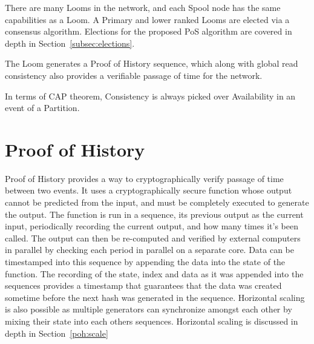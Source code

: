 \documentclass[12pt]{article}
\begin{document}
There are many Looms in the network, and each Spool node has the same capabilities as a Loom.  A Primary and lower ranked Looms are elected via a consensus algorithm. Elections for the proposed PoS algorithm are covered in depth in Section~\ref{subsec:elections}.

The Loom generates a Proof of History sequence, which along with global read consistency also provides a verifiable passage of time for the network.

In terms of CAP theorem, Consistency is always picked over Availability in an event of a Partition.

\section{Proof of History}\label{proof_of_history}

Proof of History provides a way to cryptographically verify passage of time between two events. It uses a cryptographically secure function whose output cannot be predicted from the input, and must be completely executed to generate the output. The function is run in a sequence, its previous output as the current input, periodically recording the current output, and how many times it's been called. The output can then be re-computed and verified by external computers in parallel by checking each period in parallel on a separate core. Data can be timestamped into this sequence by appending the data into the state of the function.  The recording of the state, index and data as it was appended into the sequences provides a timestamp that guarantees that the data was created sometime before the next hash was generated in the sequence. Horizontal scaling is also possible as multiple generators can synchronize amongst each other by mixing their state into each others sequences.  Horizontal scaling is discussed in depth in Section~\ref{poh:scale}\\
\end{document}
